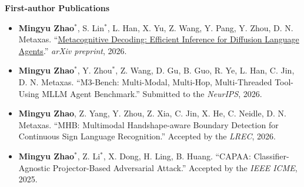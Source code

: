 \documentclass{article}
\begin{document}
\noindent \textbf{First-author Publications}\\[-10pt]
\begin{itemize}[noitemsep,nolistsep,leftmargin=*]

  \item \textbf{\color{ForestGreen} Mingyu Zhao}$^{*}$, S. Lin$^{*}$, L. Han, X. Yu, Z. Wang, Y. Pang, Y. Zhou, D. N. Metaxas.
  ``\href{https://arxiv.org/abs/2610.37642}{Metacognitive Decoding: Efficient Inference for Diffusion Language Agents}.''
  \emph{arXiv preprint}, 2026.\\[-10pt]

  \item \textbf{\color{ForestGreen} Mingyu Zhao}$^{*}$, Y. Zhou$^{*}$, Z. Wang, D. Gu, B. Guo, R. Ye, L. Han, C. Jin, D. N. Metaxas.
  ``M3-Bench: Multi-Modal, Multi-Hop, Multi-Threaded Tool-Using MLLM Agent Benchmark.''
  Submitted to the \emph{NeurIPS}, 2026.\\[-10pt]

  \item \textbf{\color{ForestGreen} Mingyu Zhao}, Z. Yang, Y. Zhou, Z. Xia, C. Jin, X. He, C. Neidle, D. N. Metaxas. ``MHB: Multimodal Handshape-aware Boundary Detection for Continuous Sign Language Recognition.'' Accepted by the \emph{LREC}, 2026.\\[-10pt]
  
  \item \textbf{\color{ForestGreen} Mingyu Zhao}$^{*}$, Z. Li$^{*}$, X. Dong, H. Ling, B. Huang. ``CAPAA: Classifier-Agnostic Projector-Based Adversarial Attack.'' Accepted by the \emph{IEEE ICME}, 2025.\\[-10pt]

\end{itemize}
\end{document}
